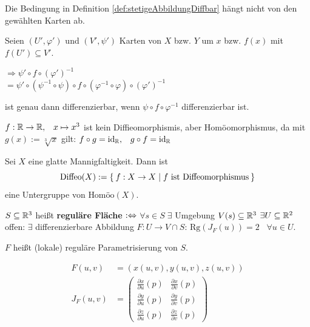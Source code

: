\begin{korollar}
    Die Bedingung in Definition \ref{def:stetigeAbbildungDiffbar} hängt nicht
    von den gewählten Karten ab.
\end{korollar}

\begin{beweis}
    Seien $(U', \varphi')$ und $(V', \psi')$ Karten von $X$ bzw. $Y$
    um $x$ bzw. $f(x)$ mit $f(U') \subseteq V'$.
    
    $\Rightarrow \psi' \circ f \circ (\varphi')^{-1}$\\
    $= \psi' \circ ( \psi^{-1} \circ \psi) \circ f \circ (\varphi^{-1} \circ \varphi ) \circ (\varphi')^{-1}$

    ist genau dann differenzierbar, wenn $\psi \circ f \circ \varphi^{-1}$
    differenzierbar ist.
\end{beweis}

\begin{beispiel}
    $f: \mathbb{R} \rightarrow \mathbb{R}, \;\;\; x \mapsto x^3$ ist kein
    Diffieomorphismis, aber Homöomorphismus, da mit $g(x) := \sqrt[3]{x}$
    gilt: $f \circ g = \text{id}_{\mathbb{R}}, \;\;\; g \circ f = \text{id}_\text{\ensuremath{\mathbb{R}}}$
\end{beispiel}

\begin{bemerkung}
    Sei $X$ eine glatte Mannigfaltigkeit. Dann ist
    \[\text{Diffeo}(X) := \Set{f:X \rightarrow X | f \text{ ist Diffeomorphismus}}\]
    eine Untergruppe von $\text{Homöo}(X)$.
\end{bemerkung}

\begin{definition}
    $S \subseteq \mathbb{R}^3$ heißt \textbf{reguläre Fläche} $:\Leftrightarrow$
    $\forall s \in S\;\exists $ Umgebung $V(s) \subseteq \mathbb{R}^3$ $\exists U \subseteq \mathbb{R}^2$ offen: $\exists$ differenzierbare Abbildung
    $F: U \rightarrow V \cap S$: $\text{Rg}(J_F(u)) = 2\;\;\;\forall u \in U$.

    $F$ heißt (lokale) reguläre Parametrisierung von $S$.

    \begin{align*}
        F(u,v) &= \left (x(u,v), y(u,v), z(u,v) \right )\\
        J_F(u,v) &= \begin{pmatrix}
            \frac{\partial x}{\partial u} (p) & \frac{\partial x}{\partial v} (p)\\
            \frac{\partial y}{\partial u} (p) & \frac{\partial y}{\partial v} (p)\\
            \frac{\partial z}{\partial u} (p) & \frac{\partial z}{\partial v} (p)
        \end{pmatrix}
    \end{align*}
\end{definition}

